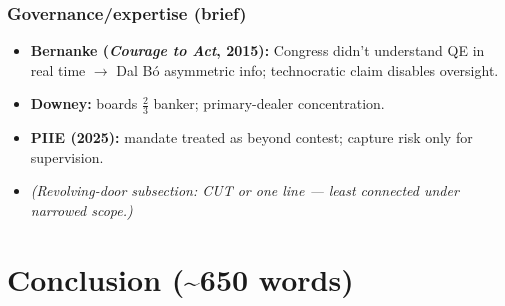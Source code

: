 \documentclass[12pt,a4paper]{article}
\begin{document}
\begin{doublespace}
\subsubsection{Governance/expertise (brief)}
\begin{itemize}
    \item \textbf{Bernanke (\textit{Courage to Act}, 2015):} Congress didn't understand QE in real time $\rightarrow$ Dal B\'{o} asymmetric info; technocratic claim disables oversight.
    \item \textbf{Downey:} boards $\frac{2}{3}$ banker; primary-dealer concentration.
    \item \textbf{PIIE (2025):} mandate treated as beyond contest; capture risk only for supervision.
    \item \textit{(Revolving-door subsection: CUT or one line --- least connected under narrowed scope.)}
\end{itemize}

\section{Conclusion (\textasciitilde650 words)}


\end{doublespace}
\end{document}

